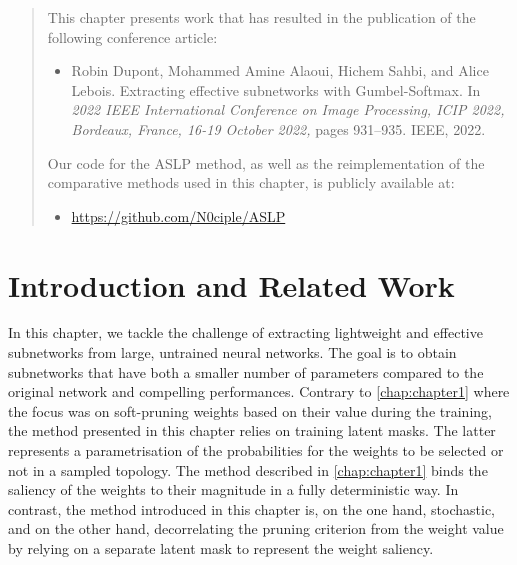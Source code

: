 \begin{abstract}
  \noindent This chapter presents work that has resulted in the publication of the
  following conference article:
  \begin{itemize}
    \item Robin Dupont, Mohammed Amine Alaoui, Hichem Sahbi, and Alice
          Lebois. Extracting effective subnetworks with Gumbel-Softmax. In \textit{2022
            IEEE International Conference on Image Processing, ICIP 2022, Bordeaux,
            France, 16-19 October 2022,} pages 931–935. IEEE, 2022.
  \end{itemize}

  \noindent Our code for the \ac{ASLP} method, as well as the reimplementation
  of the comparative methods used in this chapter, is publicly available at:
  \begin{itemize}
    \item \url{https://github.com/N0ciple/ASLP}
  \end{itemize}

\end{abstract}

\section{Introduction and Related Work}

In this chapter, we tackle the challenge of extracting lightweight and effective
subnetworks from large, untrained neural networks. The goal is to obtain
subnetworks that have both a smaller number of parameters compared to the
original network and compelling performances. Contrary to \cref{chap:chapter1}
where the focus was on soft-pruning weights based on their value during the
training, the method presented in this chapter relies on training latent masks.
The latter represents a parametrisation of the probabilities for the weights to
be selected or not in a sampled topology. The method described in
\cref{chap:chapter1} binds the saliency of the weights to their magnitude in a
fully deterministic way. In contrast, the method introduced in this chapter is,
on the one hand, stochastic, and on the other hand, decorrelating the pruning
criterion from the weight value by relying on a separate latent mask to
represent the weight saliency.\\

